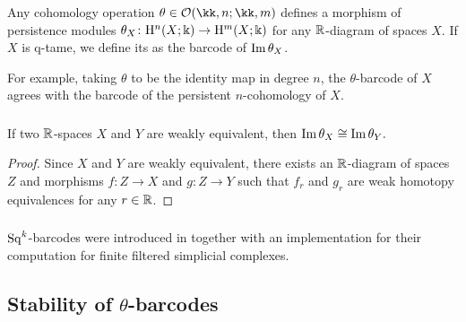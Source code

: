 \subsubsection{} \label{subsubsec:theta-barcodes}
Any cohomology operation $\theta \in \cO(\kk,n; \kk,m)$ defines a morphism of persistence modules $\theta_X \colon \mathrm{H}^n(X; \Bbbk) \to \mathrm{H}^m(X; \Bbbk)$ for any $\mathbb{R}$-diagram of spaces $X$.
If $X$ is q-tame, we define its  as the barcode of $\operatorname{Im}\theta_X$.

For example, taking $\theta$ to be the identity map in degree $n$, the $\theta$-barcode of $X$ agrees with the barcode of the persistent $n$-cohomology of $X$.

\subsubsection{}\label{lem:w.h.e. preservance}
\lemma If two $\mathbb{R}$-spaces $X$ and $Y$ are weakly equivalent, then $\operatorname{Im}\theta_{X}\cong\operatorname{Im}\theta_{Y}.$

\begin{proof}
	Since $X$ and $Y$ are weakly equivalent, there exists an $\mathbb{R}$-diagram of spaces $Z$ and morphisms $f \colon Z \to X$ and $g \colon Z \to Y$ such that $f_r$ and $g_r$ are weak homotopy equivalences for any $r \in \mathbb{R}$.
\end{proof}

\subsubsection{} $\operatorname{Sq}^k$-barcodes were introduced in \cite{medina2022per_st} together with an implementation for their computation for finite filtered simplicial complexes.

\subsection{Stability of $\theta$-barcodes}\label{ss:stability}

